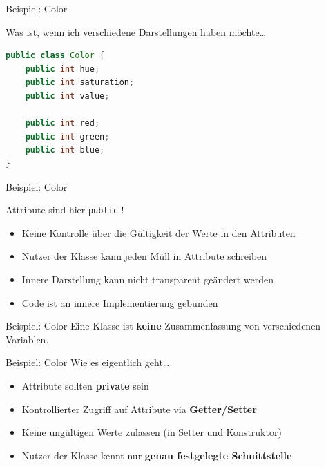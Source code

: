 \documentclass[18pt]{beamer}
\begin{document}
\begin{frame}[fragile]{Beispiel: Color}

    Was ist, wenn ich verschiedene Darstellungen haben möchte\dots

    \begin{exampleblock}{}
        \begin{lstlisting}[language=Java]
public class Color {
    public int hue;
    public int saturation;
    public int value;

    public int red;
    public int green;
    public int blue;
}
        \end{lstlisting}

    \end{exampleblock}

\end{frame}


\begin{frame}{Beispiel: Color}

    \alert{Attribute sind hier \texttt{public} !}

    \begin{itemize}
        \item Keine Kontrolle über die Gültigkeit der Werte in den Attributen
        \item Nutzer der Klasse kann jeden Müll in Attribute schreiben
        \item Innere Darstellung kann nicht transparent geändert werden
        \item Code ist an innere Implementierung gebunden
    \end{itemize}
\end{frame}

\begin{frame}{Beispiel: Color}
    \LARGE{Eine Klasse ist \textbf{keine} Zusammenfassung von verschiedenen Variablen.}

\end{frame}

\begin{frame}[fragile]{Beispiel: Color}
    Wie es eigentlich geht\dots

    \begin{itemize}
        \item Attribute sollten \textbf{private} sein
        \item Kontrollierter Zugriff auf Attribute via \textbf{Getter/Setter}
        \item Keine ungültigen Werte zulassen (in Setter und Konstruktor)
        \item Nutzer der Klasse kennt nur \textbf{genau festgelegte Schnittstelle}
    \end{itemize}
\end{frame}
\end{document}
